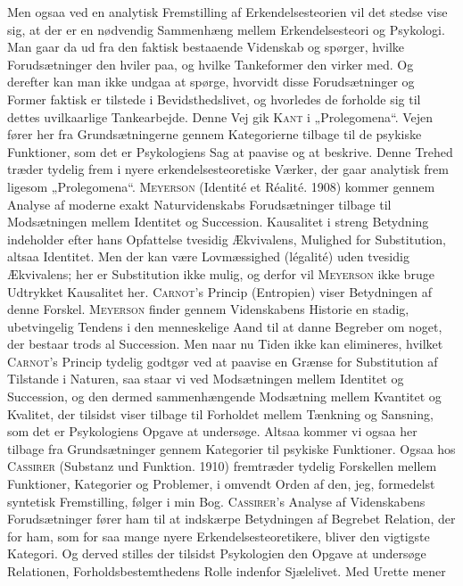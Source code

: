 \documentclass[12pt]{article}
\newcommand{\opage}[1]{\marginnote{\footnotesize\textit{[#1]}}}
\begin{document}
Men ogsaa ved en analytisk Fremstilling af Erkendelsesteorien vil det stedse
vise sig, at der er en nødvendig Sammenhæng mellem Erkendelsesteori og
Psykologi. Man gaar da ud fra den faktisk bestaaende Videnskab og spørger,
hvilke Forudsætninger den hviler paa, og hvilke Tankeformer den virker med. Og
derefter kan man ikke undgaa at spørge, hvorvidt disse Forudsætninger og Former
faktisk er tilstede i Bevidsthedslivet, og hvorledes de forholde sig til dettes
uvilkaarlige Tankearbejde. Denne Vej gik \textsc{Kant} i „Prolegomena“. Vejen
fører her fra Grundsætningerne gennem Kategorierne tilbage til de psykiske
Funktioner, som det er Psykologiens Sag at paavise og at beskrive. Denne Trehed
træder tydelig frem i nyere erkendelsesteoretiske Værker, der gaar analytisk
frem ligesom „Prolegomena“. \textsc{Meyerson} (Identité et Réalité. 1908)
kommer gennem Analyse af moderne exakt Naturvidenskabs Forudsætninger tilbage
til Modsætningen mellem Identitet og Succession. Kausalitet i streng Betydning
indeholder efter hans Opfattelse tvesidig Ækvivalens, Mulighed for Substitution,
altsaa Identitet. Men der kan være Lovmæssighed (légalité) uden tvesidig
Ækvivalens; her er Substitution ikke mulig, og derfor vil \textsc{Meyerson} ikke
bruge Udtrykket Kausalitet her. \textsc{Carnot}'s Princip (Entropien) viser
Betydningen af denne Forskel. \textsc{Meyerson} finder gennem Videnskabens
Historie en stadig, ubetvingelig Tendens i den menneskelige Aand til at danne
Begreber om noget, der bestaar trods al Succession. Men naar nu Tiden ikke kan
elimineres, hvilket \textsc{Carnot}'s Princip tydelig godtgør ved at paavise en
Grænse for Substitution af Tilstande i Naturen, saa staar vi ved Modsætningen
mellem Identitet og Succession, og den dermed sammenhængende Modsætning mellem
Kvantitet og Kvalitet, der tilsidst viser tilbage til Forholdet mellem Tænkning
og Sansning, som det er Psykologiens Opgave at undersøge. Altsaa kommer vi ogsaa
her tilbage fra Grundsætninger gennem Kategorier til psykiske Funktioner. Ogsaa
hos \textsc{Cassirer} (Substanz und Funktion. 1910) fremtræder tydelig
Forskellen mellem Funktioner, Kategorier og Problemer, i omvendt Orden af den,
jeg, formedelst syntetisk Fremstilling, følger i min Bog. \textsc{Cassirer}'s
Analyse af Videnskabens Forudsætninger fører ham til at indskærpe Betydningen af
Begrebet Relation, der for ham, som
\opage{15}for saa mange nyere Erkendelsesteoretikere, bliver den vigtigste
Kategori. Og derved stilles der tilsidst Psykologien den Opgave at undersøge
Relationen, Forholdsbestemthedens Rolle indenfor Sjælelivet. Med Urette mener
\end{document}
